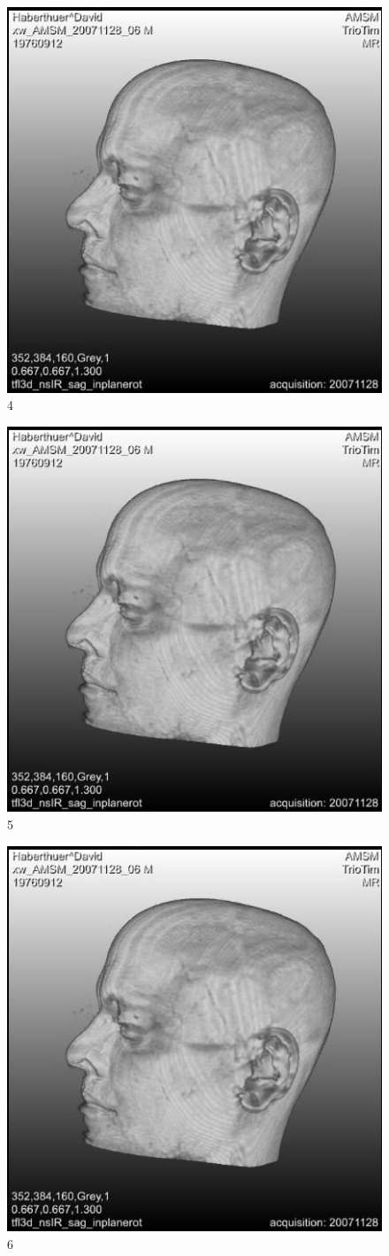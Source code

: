 \documentclass{article}
\begin{document}
\begin{figure}
	\centering
	\includegraphics[width=0.618\linewidth]{scalebarimage}
	\caption{4}
\end{figure}
\clearpage

\begin{figure}
	\centering
	\includegraphics[width=0.618\linewidth]{scalebarimage}
	\caption{5}
\end{figure}
\clearpage

\begin{figure}
	\centering
	\includegraphics[width=0.618\linewidth]{scalebarimage}
	\caption{6}
\end{figure}
\clearpage
\end{document}
